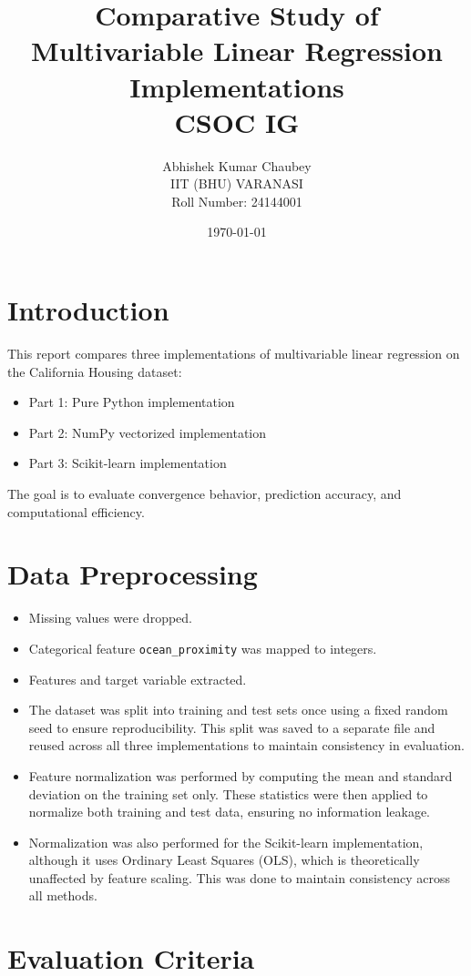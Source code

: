 \documentclass[a4paper,12pt]{article}
\title{Comparative Study of Multivariable Linear Regression Implementations \\
{\large CSOC IG}}
\author{Abhishek Kumar Chaubey \\ IIT (BHU) VARANASI \\ Roll Number: 24144001}
\date{\today}
\begin{document}
\maketitle
\tableofcontents
\newpage

\section{Introduction}
This report compares three implementations of multivariable linear regression on the California Housing dataset:
\begin{itemize}
    \item Part 1: Pure Python implementation
    \item Part 2: NumPy vectorized implementation
    \item Part 3: Scikit-learn implementation
\end{itemize}

The goal is to evaluate convergence behavior, prediction accuracy, and computational efficiency.

\section{Data Preprocessing}
\begin{itemize}
    \item Missing values were dropped.
    \item Categorical feature \texttt{ocean\_proximity} was mapped to integers.
    \item Features and target variable extracted.
    \item The dataset was split into training and test sets once using a fixed random seed to ensure reproducibility. This split was saved to a separate file and reused across all three implementations to maintain consistency in evaluation.
    \item Feature normalization was performed by computing the mean and standard deviation on the training set only. These statistics were then applied to normalize both training and test data, ensuring no information leakage.
    \item Normalization was also performed for the Scikit-learn implementation, although it uses Ordinary Least Squares (OLS), which is theoretically unaffected by feature scaling. This was done to maintain consistency across all methods.
\end{itemize}

\section{Evaluation Criteria}
\end{document}

